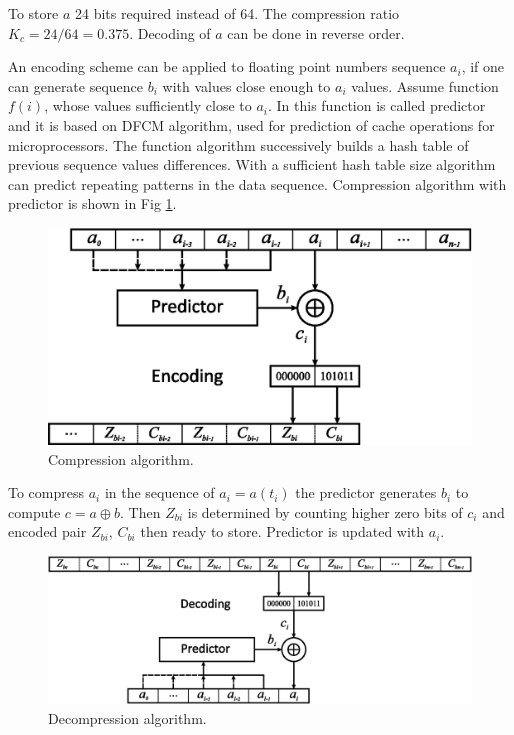 \documentclass[lettersize,journal]{IEEEtran}
\begin{document}
To store \(a\) 24 bits required instead of 64. The compression ratio \(K_c=24/64=0.375\). 
Decoding of \(a\) can be done in reverse order.

An encoding scheme can be applied to floating point numbers sequence \(a_i\), if one can generate sequence \(b_i\)
with values close enough to \(a_i\) values. Assume function \(f(i)\), whose values sufficiently close to \(a_i\).
In \cite{ratana06} this function is called predictor and it is based on DFCM algorithm, used for prediction of cache operations for microprocessors. The function algorithm successively builds a hash table of previous sequence values differences. 
With a sufficient hash table size algorithm can predict repeating patterns in the data sequence. Compression
algorithm with predictor is shown in Fig \ref{fig_compr}.

\begin{figure}[h]
	\centering
	\includegraphics[width=0.8\columnwidth]{fig1.eps}
	\caption{Compression algorithm.}
	\label{fig_compr}
\end{figure}

To compress \(a_i\) in the sequence of \(a_i=a(t_i)\) the predictor generates \(b_i\) to compute 
\(c=a \oplus b \). 
Then \(Z_{bi}\) is determined by counting higher zero bits of \(c_i\) and encoded pair \(Z_{bi}\), \(C_{bi}\) then ready to store.
Predictor is updated with \(a_i\).

\begin{figure}[h]
	\centering
	\includegraphics[width=0.8\columnwidth]{fig2.eps}
	\caption{Decompression algorithm.}
	\label{fig_decompr}
\end{figure}
\end{document}
